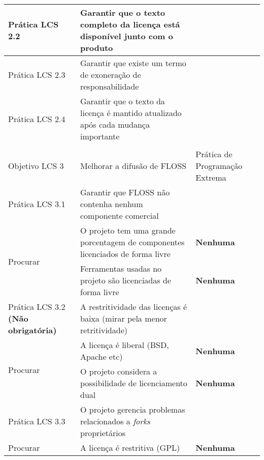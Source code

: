 \begin{longtable}{|p{2cm}|p{7cm}|p{7cm}|}
  \hline \cellcolor[gray]{0.9} Prática LCS 2.2 & \cellcolor[gray]{0.9}
  Garantir que o texto completo da licença está disponível junto com o
  produto & \\
  \hline \cellcolor[gray]{0.9} Prática LCS 2.3 & \cellcolor[gray]{0.9}
  Garantir que existe um termo de exoneração de responsabilidade & \\
  \hline \cellcolor[gray]{0.9} Prática LCS 2.4 & \cellcolor[gray]{0.9}
  Garantir que o texto da licença é mantido atualizado após cada
  mudança importante & \\
  \hline
  & & \\
  \hline \cellcolor[gray]{0.6} Objetivo LCS 3 & \cellcolor[gray]{0.6}
  Melhorar a difusão de FLOSS & Prática de Programação Extrema \\
  \hline \cellcolor[gray]{0.9} Prática LCS 3.1 & \cellcolor[gray]{0.9}
  Garantir que FLOSS não contenha nenhum componente comercial & \\
  \hline \multirow{2}{*}{Procurar} & O projeto tem uma grande
  porcentagem de componentes licenciados de forma livre &
  \textbf{Nenhuma} \\
  \cline{2-3} & Ferramentas usadas no projeto são licenciadas de forma
  livre & \textbf{Nenhuma} \\
  \hline \cellcolor[gray]{0.9} Prática LCS 3.2 \textbf{(Não
    obrigatória)} & \cellcolor[gray]{0.9}
  A restritividade das licenças é baixa (mirar pela menor retritividade) & \\
  \hline \multirow{2}{*}{Procurar} & A licença é liberal (BSD, Apache
  etc) &  \textbf{Nenhuma} \\
  \cline{2-3} & O projeto considera a possibilidade de licenciamento
  dual & \textbf{Nenhuma} \\
  \hline \cellcolor[gray]{0.9} Prática LCS 3.3 & \cellcolor[gray]{0.9}
  O projeto gerencia problemas relacionados a \textit{forks} proprietários & \\
  \hline \multirow{1}{*}{Procurar} & A licença é restritiva (GPL) &
  \textbf{Nenhuma} \\
  \hline
\end{longtable}

